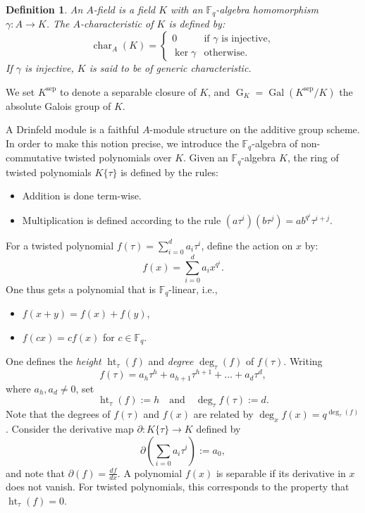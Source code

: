 \documentclass[11pt]{amsart}
\newtheorem{definition}[theorem]{Definition}
\newcommand{\F}{\mathbb{F}}
\newcommand{\op}[1]{\operatorname{#1}}
\numberwithin{equation}{section}
\begin{document}
\begin{definition}
    An $ A $-field is a field $ K $ with an $\mathbb{F}_q$-algebra homomorphism $\gamma: A \rightarrow K$. The $ A $-characteristic of $ K $ is defined by:
\[
\op{char}_A(K) = 
\begin{cases}
0 & \text{if } \gamma \text{ is injective}, \\
\ker \gamma & \text{otherwise}.
\end{cases}
\]
If $\gamma$ is injective, $ K $ is said to be of generic characteristic.
\end{definition}
We set $ K^{\op{sep}} $ to denote a separable closure of $ K $, and $\op{G}_K = \op{Gal}(K^{\op{sep}}/K) $ the absolute Galois group of $ K $. 
\par A Drinfeld module is a faithful $A$-module structure on the additive group scheme. In order to make this notion precise, we introduce the $\F_q$-algebra of non-commutative twisted polynomials over $K$. Given an $\mathbb{F}_q$-algebra $ K $, the ring of twisted polynomials $ K\{\tau\} $ is defined by the rules:
\begin{itemize}
    \item Addition is done term-wise.
    \item Multiplication is defined according to the rule $(a\tau^i)(b\tau^j) = ab^{q^i} \tau^{i+j}$.
\end{itemize}
For a twisted polynomial $ f(\tau) = \sum_{i=0}^d a_i \tau^i $, define the action on $ x $ by:
\[
f(x) = \sum_{i=0}^d a_i x^{q^i}.
\]
One thus gets a polynomial that is $\F_q$-linear, i.e., 
\begin{itemize}
    \item $f(x+y)=f(x)+f(y)$, 
    \item $f(c x)=c f(x)$ for $c\in \F_q$. 
\end{itemize}
One defines the \emph{height} $\op{ht}_\tau(f) $ and \emph{degree} $\op{deg}_\tau(f) $ of $ f(\tau) $. Writing \[f(\tau) = a_h \tau^h + a_{h+1} \tau^{h+1} + \dots + a_d \tau^d,\] where $ a_h, a_d \neq 0$, set
\[
\op{ht}_\tau(f) := h \quad \text{and} \quad 
\op{deg}_\tau f(\tau):=d.\]
Note that the degrees of $f(\tau)$ and $f(x)$ are related by $\op{deg}_x f(x) = q^{\op{deg}_\tau(f)}$. Consider the derivative map $\partial: K\{\tau\}\rightarrow K$ defined by 
\[\partial\left(\sum_{i=0} a_i \tau^i\right):=a_0,\] and note that $\partial(f)=\frac{df}{dx}$. A polynomial $ f(x) $ is separable if its derivative in $ x $ does not vanish. For twisted polynomials, this corresponds to the property that $\op{ht}_\tau(f) = 0$.
\end{document}
